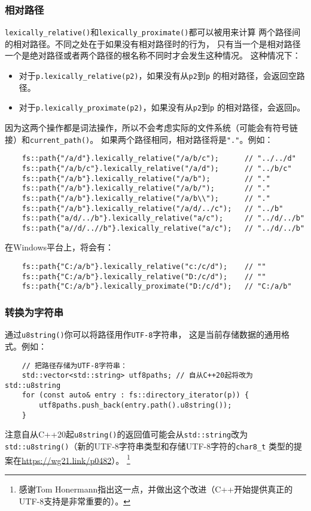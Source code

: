 \subsubsection{相对路径}
\texttt{lexically\_relative()}和\texttt{lexically\_proximate()}都可以被用来计算
两个路径间的相对路径。不同之处在于如果没有相对路径时的行为，
只有当一个是相对路径一个是绝对路径或者两个路径的根名称不同时才会发生这种情况。
这种情况下：
\begin{itemize}
    \item 对于\texttt{p.lexically\_relative(p2)}，如果没有从\texttt{p2}到\texttt{p}
    的相对路径，会返回空路径。
    \item 对于\texttt{p.lexically\_proximate(p2)}，如果没有从\texttt{p2}到\texttt{p}
    的相对路径，会返回\texttt{p}。
\end{itemize}
因为这两个操作都是词法操作，所以不会考虑实际的文件系统（可能会有符号链接）和\texttt{current\_path()}。
如果两个路径相同，相对路径将是\texttt{"."}。例如：
\begin{lstlisting}
    fs::path{"/a/d"}.lexically_relative("/a/b/c");      // "../../d"
    fs::path{"/a/b/c"}.lexically_relative("/a/d");      // "../b/c"
    fs::path{"/a/b"}.lexically_relative("/a/b");        // "."
    fs::path{"/a/b"}.lexically_relative("/a/b/");       // "."
    fs::path{"/a/b"}.lexically_relative("/a/b\\");      // "."
    fs::path{"/a/b"}.lexically_relative("/a/d/../c");   // "../b"
    fs::path{"a/d/../b"}.lexically_relative("a/c");     // "../d/../b"
    fs::path{"a//d/..//b"}.lexically_relative("a/c");   // "../d/../b"
\end{lstlisting}
在Windows平台上，将会有：
\begin{lstlisting}
    fs::path{"C:/a/b"}.lexically_relative("c:/c/d");    // ""
    fs::path{"C:/a/b"}.lexically_relative("D:/c/d");    // ""
    fs::path{"C:/a/b"}.lexically_proximate("D:/c/d");   // "C:/a/b"
\end{lstlisting}

\subsubsection{转换为字符串}
通过\texttt{u8string()}你可以将路径用作\texttt{UTF-8}字符串，
这是当前存储数据的通用格式。例如：
\begin{lstlisting}
    // 把路径存储为UTF-8字符串：
    std::vector<std::string> utf8paths; // 自从C++20起将改为std::u8string
    for (const auto& entry : fs::directory_iterator(p)) {
        utf8paths.push_back(entry.path().u8string());
    }
\end{lstlisting}
注意自从C++20起\texttt{u8string()}的返回值可能会从\texttt{std::string}改为
\texttt{std::u8string()}（新的UTF-8字符串类型和存储UTF-8字符的\texttt{char8\_t}
类型的提案在\url{https://wg21.link/p0482}）。
\footnote{感谢Tom Honermann指出这一点，并做出这个改进（C++开始提供真正的UTF-8支持是非常重要的）。}

